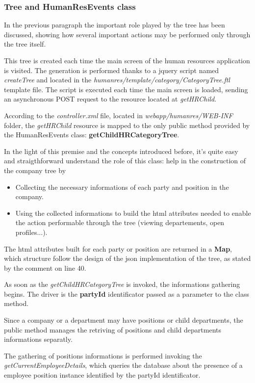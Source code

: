 \subsubsection{Tree and HumanResEvents class}

In the previous paragraph the important role played by the tree has been discussed, showing how several important actions may be performed only through the tree itself. 

This tree is created each time the main screen of the human resources application is visited. The generation is performed thanks to a jquery script named \textit{createTree} and located in the \textit{humanres/template/category/CategoryTree.ftl} template file.
The script is executed each time the main screen is loaded, sending an asynchronous POST request to the resource located at \textit{getHRChild}.

According to the \textit{controller.xml} file, located in \textit{webapp/humanres/WEB-INF} folder, the \textit{getHRChild} resource is mapped to the only public method provided by the HumanResEvents class: \textbf{getChildHRCategoryTree}.

In the light of this premise and the concepts introduced before, it's quite easy and straigthforward understand the role of this class: help in the construction of the company tree by

\begin{itemize}
	\item Collecting the necessary informations of each party and position in the company.
	\item Using the collected informations to build the html attributes needed to enable the action performable through the tree (viewing departements, open profiles...).
\end{itemize}

The html attributes built for each party or position are returned in a \textbf{Map}, which structure follow the design of the json implementation of the tree, as stated by the comment on line 40.

As soon as the \textit{getChildHRCategoryTree} is invoked, the informations gathering begins. The driver is the \textbf{partyId} identificator passed as a parameter to the class method.

Since a company or a department may have positions or child departments, the public method manages the retriving of positions and child departments informations separatly.

The gathering of positions informations is performed invoking the \textit{getCurrentEmployeeDetails}, which queries the database about the presence of a employee position instance identified by the partyId identificator.

